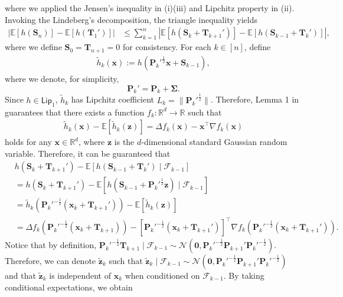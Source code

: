 where we applied the Jensen's inequality in (i)(iii) and Lipchitz property in (ii). 
Invoking the Lindeberg's decomposition, the triangle inequality yields
\begin{align}\label{eq:Srikant-Lindeberg}
|\mathbb{E}[h(\bm{S}_n)]-\mathbb{E}[h(\bm{T}_1')]| &\leq \sum_{k=1}^n |\mathbb{E}[h(\bm{S}_k+\bm{T}_{k+1}')]-\mathbb{E}[h(\bm{S}_{k-1}+\bm{T}_k')]|,
\end{align}
where we define $\bm{S}_0=\bm{T}_{n+1}=0$ for consistency. For each $k \in [n]$, define
\begin{align*}
\tilde{h}_k(\bm{x}):= h(\bm{P}_k'^{\frac{1}{2}}\bm{x}+\bm{S}_{k-1}),
\end{align*}
where we denote, for simplicity, $$\bm{P}_k' = \bm{P}_k + \bm{\Sigma}.$$ 
Since $h \in \mathsf{Lip}_1$, $\tilde{h}_k$ has Lipchitz coefficient $L_k = \|\bm{P}_k'^{\frac{1}{2}}\|$. Therefore, Lemma 1 in \cite{srikant2024rates} guarantees that there exists a function $f_k: \mathbb{R}^d \to \mathbb{R}$ such that
\begin{align*}
\tilde{h}_k(\bm{x})-\mathbb{E}[\tilde{h}_k(\bm{z})] = \Delta f_k(\bm{x}) - \bm{x}^\top \nabla f_k(\bm{x})
\end{align*}
holds for any $\bm{x} \in \mathbb{R}^d$, where $\bm{z}$ is the $d$-dimensional standard Gaussian random variable. Therefore, it can be guaranteed that
\begin{align*}
&h(\bm{S}_k + \bm{T}_{k+1}') -\mathbb{E}[h(\bm{S}_{k-1} + \bm{T}_k')\mid \mathscr{F}_{k-1}]\\ 
&= h(\bm{S}_k + \bm{T}_{k+1}') -\mathbb{E}[h(\bm{S}_{k-1} + \bm{P}_k'^{\frac{1}{2}}\bm{z})\mid \mathscr{F}_{k-1}] \\ 
&= \tilde{h}_k(\bm{P}_k'^{-\frac{1}{2}}(\bm{x}_k + \bm{T}_{k+1}'))-\mathbb{E}[\tilde{h}_k(\bm{z})] \\ 
&= \Delta f_k(\bm{P}_k'^{-\frac{1}{2}}(\bm{x}_k + \bm{T}_{k+1})) - \left[\bm{P}_k'^{-\frac{1}{2}}(\bm{x}_k + \bm{T}_{k+1}')\right]^\top \nabla f_k(\bm{P}_k'^{-\frac{1}{2}}(\bm{x}_k + \bm{T}_{k+1}')).
\end{align*}
Notice that by definition, $\bm{P}_k'^{-\frac{1}{2}}\bm{T}_{k+1} \mid \mathscr{F}_{k-1} \sim \mathcal{N}(\bm{0},\bm{P}_k'^{-\frac{1}{2}}\bm{P}_{k+1}'\bm{P}_k'^{-\frac{1}{2}})$. Therefore, we can denote $\tilde{\bm{z}}_k$ such that $\tilde{\bm{z}}_k \mid \mathscr{F}_{k-1} \sim \mathcal{N}(\bm{0},\bm{P}_k'^{-\frac{1}{2}}\bm{P}_{k+1}'\bm{P}_k'^{-\frac{1}{2}})$ and that $\tilde{\bm{z}}_k$ is independent of $\bm{x}_k$ when conditioned on $\mathscr{F}_{k-1}$. By taking conditional expectations, we obtain
